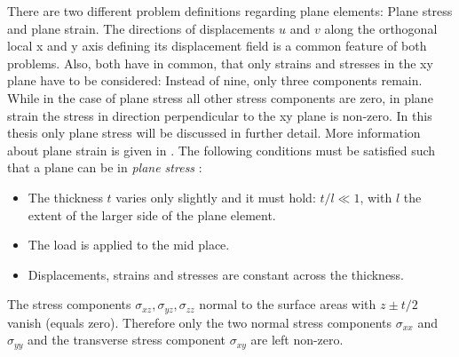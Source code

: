 \documentclass[11pt,twoside]{scrartcl}
\begin{document}
  There are two different problem definitions regarding plane elements: Plane stress and plane strain. The directions of displacements $u$ and $v$ along the orthogonal local x and y axis defining its displacement field is a common feature of both problems. Also, both have in common, that only strains and stresses in the xy plane have to be considered: Instead of nine, only three components remain. While in the case of plane stress all other stress components are zero, in plane strain the stress in direction perpendicular to the xy plane is non-zero. In this thesis only plane stress will be discussed in further detail. More information about plane strain is given in \cite{zienkiewicz2000finite}. %
  The following conditions must be satisfied such that a plane can be in \textit{plane stress} \cite{steinke2005finite}:
  \begin{itemize}
  	\item The thickness $t$ varies only slightly and it must hold: $t/l \ll 1$, with $l$ the extent of the larger side of the plane element.
  	\item The load is applied to the mid place.
  	\item Displacements, strains and stresses are constant across the thickness.
  \end{itemize}
  The stress components $\sigma_{xz},\sigma_{yz},\sigma_{zz}$ normal to the surface areas with $z \pm t/2$ vanish (equals zero). Therefore only the two normal stress components $\sigma_{xx}$ and $\sigma_{yy}$ and the transverse stress component $\sigma_{xy}$ are left non-zero.
    
\end{document}
